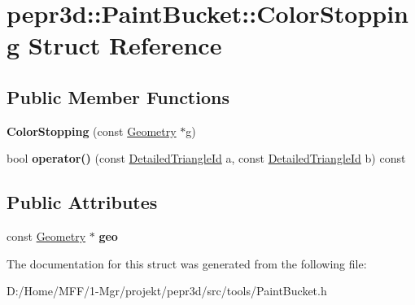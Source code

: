 \hypertarget{structpepr3d_1_1_paint_bucket_1_1_color_stopping}{}\section{pepr3d\+::Paint\+Bucket\+::Color\+Stopping Struct Reference}
\label{structpepr3d_1_1_paint_bucket_1_1_color_stopping}
\subsection*{Public Member Functions}
\begin{DoxyCompactItemize}
\item 
\mbox{\label{structpepr3d_1_1_paint_bucket_1_1_color_stopping_aa9854e4872717fd4f65240fa13783be2}} 
{\bfseries Color\+Stopping} (const \mbox{\hyperlink{classpepr3d_1_1_geometry}{Geometry}} $\ast$g)
\item 
\mbox{\label{structpepr3d_1_1_paint_bucket_1_1_color_stopping_afca79420fc0059b51d53c829846009a9}} 
bool {\bfseries operator()} (const \mbox{\hyperlink{structpepr3d_1_1_detailed_triangle_id}{Detailed\+Triangle\+Id}} a, const \mbox{\hyperlink{structpepr3d_1_1_detailed_triangle_id}{Detailed\+Triangle\+Id}} b) const
\end{DoxyCompactItemize}
\subsection*{Public Attributes}
\begin{DoxyCompactItemize}
\item 
\mbox{\label{structpepr3d_1_1_paint_bucket_1_1_color_stopping_aa5f3760dc71038712627b65bd263af6f}} 
const \mbox{\hyperlink{classpepr3d_1_1_geometry}{Geometry}} $\ast$ {\bfseries geo}
\end{DoxyCompactItemize}


The documentation for this struct was generated from the following file\+:\begin{DoxyCompactItemize}
\item 
D\+:/\+Home/\+M\+F\+F/1-\/\+Mgr/projekt/pepr3d/src/tools/Paint\+Bucket.\+h\end{DoxyCompactItemize}
